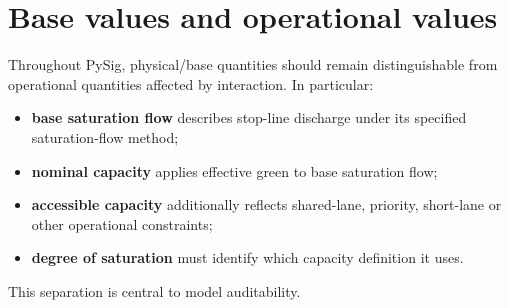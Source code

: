 \section{Base values and operational values}
Throughout PySig, physical/base quantities should remain distinguishable from
operational quantities affected by interaction.  In particular:

\begin{itemize}
\item \textbf{base saturation flow} describes stop-line discharge under its specified
      saturation-flow method;
\item \textbf{nominal capacity} applies effective green to base saturation flow;
\item \textbf{accessible capacity} additionally reflects shared-lane, priority,
      short-lane or other operational constraints;
\item \textbf{degree of saturation} must identify which capacity definition it uses.
\end{itemize}

This separation is central to model auditability.
